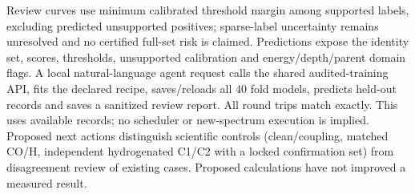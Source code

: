 Review curves use minimum calibrated threshold margin among supported labels, excluding predicted unsupported positives; sparse-label uncertainty remains unresolved and no certified full-set risk is claimed. Predictions expose the identity set, scores, thresholds, unsupported calibration and energy/depth/parent domain flags. A local natural-language agent request calls the shared audited-training API, fits the declared recipe, saves/reloads all 40 fold models, predicts held-out records and saves a sanitized review report. All round trips match exactly. This uses available records; no scheduler or new-spectrum execution is implied. Proposed next actions distinguish scientific controls (clean/coupling, matched CO/H, independent hydrogenated C1/C2 with a locked confirmation set) from disagreement review of existing cases. Proposed calculations have not improved a measured result.

